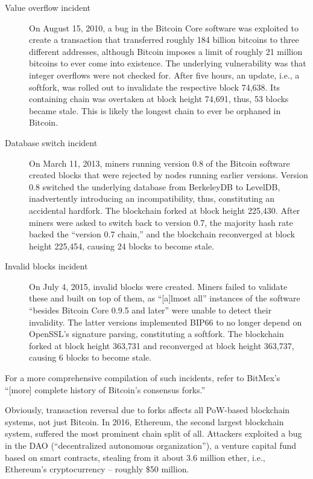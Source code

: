 \begin{description}
	\item[Value overflow incident]
		On August 15, 2010, a bug in the Bitcoin Core software was exploited to create a transaction that transferred roughly 184 billion bitcoins to three different addresses, although Bitcoin imposes a limit of roughly 21 million bitcoins to ever come into existence.
		The underlying vulnerability was that integer overflows were not checked for.
		After five hours, an update, i.e., a softfork, was rolled out to invalidate the respective block 74,638.
		Its containing chain was overtaken at block height 74,691, thus, 53 blocks became stale.
		\autocite{bitcoinwiki2016valueoverflowincident}
		This is likely the longest chain to ever be orphaned in Bitcoin.
	\item[Database switch incident]
		On March 11, 2013, miners running version 0.8 of the Bitcoin software created blocks that were rejected by nodes running earlier versions.
		Version 0.8 switched the underlying database from BerkeleyDB to LevelDB, inadvertently introducing an incompatibility, thus, constituting an accidental hardfork.
		The blockchain forked at block height 225,430.
		After miners were asked to switch back to version 0.7, the majority hash rate backed the ``version 0.7 chain,'' and the blockchain reconverged at block height 225,454, causing 24 blocks to become stale.
		\autocite{bitcoinmag2013bitcoinfork}
	\item[Invalid blocks incident]
		On July 4, 2015, invalid blocks were created.
		Miners failed to validate these and built on top of them, as ``[a]lmost all''  instances of the software ``besides Bitcoin Core 0.9.5 and later'' were unable to detect their invalidity. \autocite{bitcoin2015invalidblocks}
		The latter versions implemented BIP66 \autocite{github2015bitcoinbip66} to no longer depend on OpenSSL's signature parsing, constituting a softfork.
		The blockchain forked at block height 363,731 and reconverged at block height 363,737, causing 6 blocks to become stale.
		\autocite{reddit2015bitcoininvalidblocks}
\end{description}

For a more comprehensive compilation of such incidents, refer to BitMex's ``[more] complete history of Bitcoin's consensus forks.'' \autocite{bitmex2017bitcoinforkhistory}

Obviously, transaction reversal due to forks affects all PoW-based blockchain systems, not just Bitcoin.
In 2016, Ethereum, the second largest blockchain system, suffered the most prominent chain split of all.
Attackers exploited a bug in the DAO (``decentralized autonomous organization''), a venture capital fund based on smart contracts, stealing from it about 3.6 million ether, i.e., Ethereum's cryptocurrency -- roughly \$50 million. \autocite[75]{dhillon2017}

